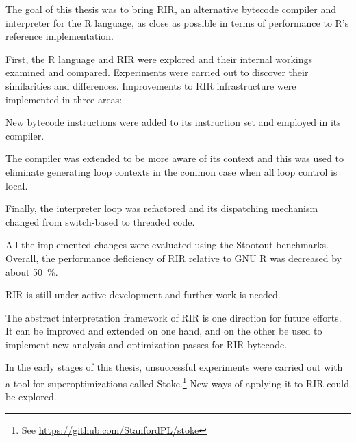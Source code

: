 The goal of this thesis was to bring RIR, an alternative bytecode compiler and interpreter for the R language, as close as possible in terms of performance to R's reference implementation.

First, the R language and RIR were explored and their internal workings examined and compared. Experiments were carried out to discover their similarities and differences. Improvements to RIR infrastructure were implemented in three areas:

New bytecode instructions were added to its instruction set and employed in its compiler.

The compiler was extended to be more aware of its context and this was used to eliminate generating loop contexts in the common case when all loop control is local.

Finally, the interpreter loop was refactored and its dispatching mechanism changed from switch-based to threaded code.

All the implemented changes were evaluated using the Stootout benchmarks. Overall, the performance deficiency of RIR relative to GNU R was decreased by about 50~\%.

RIR is still under active development and further work is needed. 

The abstract interpretation framework of RIR is one direction for future efforts. It can be improved and extended on one hand, and on the other be used to implement new analysis and optimization passes for RIR bytecode.

In the early stages of this thesis, unsuccessful experiments were carried out with a tool for superoptimizations called Stoke.\footnote{See \url{https://github.com/StanfordPL/stoke}} New ways of applying it to RIR could be explored.
